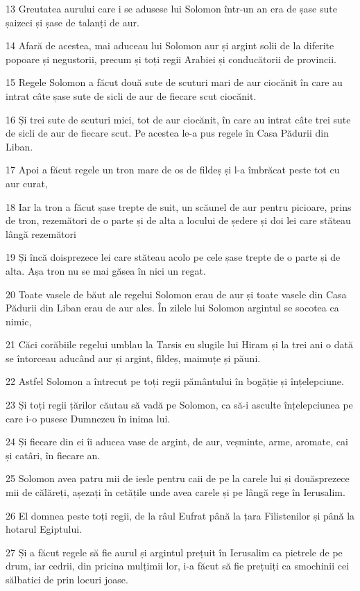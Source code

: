 \par 13 Greutatea aurului care i se adusese lui Solomon într-un an era de șase sute șaizeci și șase de talanți de aur.
\par 14 Afară de acestea, mai aduceau lui Solomon aur și argint solii de la diferite popoare și negustorii, precum și toți regii Arabiei și conducătorii de provincii.
\par 15 Regele Solomon a făcut două sute de scuturi mari de aur ciocănit în care au intrat câte șase sute de sicli de aur de fiecare scut ciocănit.
\par 16 Și trei sute de scuturi mici, tot de aur ciocănit, în care au intrat câte trei sute de sicli de aur de fiecare scut. Pe acestea le-a pus regele în Casa Pădurii din Liban.
\par 17 Apoi a făcut regele un tron mare de os de fildeș și l-a îmbrăcat peste tot cu aur curat,
\par 18 Iar la tron a făcut șase trepte de suit, un scăunel de aur pentru picioare, prins de tron, rezemători de o parte și de alta a locului de ședere și doi lei care stăteau lângă rezemători
\par 19 Și încă doisprezece lei care stăteau acolo pe cele șase trepte de o parte și de alta. Așa tron nu se mai găsea în nici un regat.
\par 20 Toate vasele de băut ale regelui Solomon erau de aur și toate vasele din Casa Pădurii din Liban erau de aur ales. În zilele lui Solomon argintul se socotea ca nimic,
\par 21 Căci corăbiile regelui umblau la Tarsis eu slugile lui Hiram și la trei ani o dată se întorceau aducând aur și argint, fildeș, maimuțe și păuni.
\par 22 Astfel Solomon a întrecut pe toți regii pământului în bogăție și înțelepciune.
\par 23 Și toți regii țărilor căutau să vadă pe Solomon, ca să-i asculte înțelepciunea pe care i-o pusese Dumnezeu în inima lui.
\par 24 Și fiecare din ei îi aducea vase de argint, de aur, veșminte, arme, aromate, cai și catâri, în fiecare an.
\par 25 Solomon avea patru mii de iesle pentru caii de pe la carele lui și douăsprezece mii de călăreți, așezați în cetățile unde avea carele și pe lângă rege în Ierusalim.
\par 26 El domnea peste toți regii, de la râul Eufrat până la țara Filistenilor și până la hotarul Egiptului.
\par 27 Și a făcut regele să fie aurul și argintul prețuit în Ierusalim ca pietrele de pe drum, iar cedrii, din pricina mulțimii lor, i-a făcut să fie prețuiți ca smochinii cei sălbatici de prin locuri joase.

